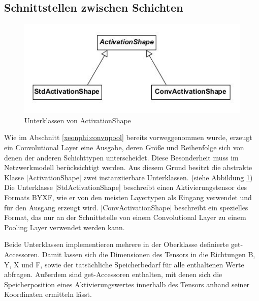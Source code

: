 \documentclass[../main.tex]{subfiles}
\begin{document}
\subsection{Schnittstellen zwischen Schichten}
\begin{figure}
	\centering 
	\includegraphics[width=\textwidth]{../images/Schmidt/cd_netdesc_actshapes.jpg} 
	\caption {Unterklassen von ActivationShape}
	\label{pic:cd_Netdesc_actshapes} 
\end{figure} 
Wie im Abschnitt \ref{xeonphi:convnpool} bereits vorweggenommen wurde, erzeugt ein Convolutional Layer eine Ausgabe, deren Größe und Reihenfolge sich von denen der anderen Schichttypen unterscheidet. Diese Besonderheit muss im Netzwerkmodell berücksichtigt werden. Aus diesem Grund besitzt die abstrakte Klasse |ActivationShape| zwei instanziierbare Unterklassen. (siehe Abbildung \ref{pic:cd_Netdesc_actshapes}) Die Unterklasse |StdActivationShape| beschreibt einen Aktivierungstensor des Formats BYXF, wie er von den meisten Layertypen als Eingang verwendet und für den Ausgang erzeugt wird. |ConvActivationShape| beschreibt ein spezielles Format, das nur an der Schnittstelle von einem Convolutional Layer zu einem Pooling Layer verwendet werden kann. 

Beide Unterklassen implementieren mehrere in der Oberklasse definierte get-Accessoren. Damit lassen sich die Dimensionen des Tensors in die Richtungen B, Y, X und F, sowie der tatsächliche Speicherbedarf für alle enthaltenen Werte abfragen. Außerdem sind get-Accessoren enthalten, mit denen sich die Speicherposition eines Aktivierungswertes innerhalb des Tensors anhand seiner Koordinaten ermitteln lässt. 
\end{document}
